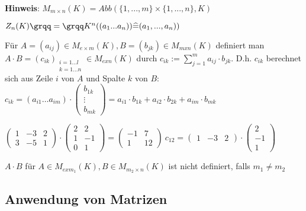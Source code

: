 \noindent\textbf{Hinweis}: $M_{m\times n}(K)=Abb(\{1,...,m\}\times\{1,...,n\},K)$\\

\begin{bem}
	$Z_n (K) \anf{=} K^n ((a_1 ...a_n))\widehat{=}(a_1 ,...,a_n))$
\end{bem}

\begin{defi}
	Für $A=(a_{ij})\in M_{e\times m}(K), B=(b_{jk})\in M_{mxn}(K)$ definiert man $A\cdot B=(c_{ik})_{\substack{i=1...l\\ k=1...n}}\in M_{exn}(K)$ durch $c_{ik}:=\sum\limits_{j=1}^m a_{ij}\cdot b_{jk}$. D.h. $c_{ik}$ berechnet sich aus Zeile $i$ von $A$ und Spalte $k$ von $B$: $c_{ik}=(a_{i1}\dots a_{im})\cdot\begin{pmatrix}
	b_{1k}\\
	\vdots\\
	b_{mk}
	\end{pmatrix}= a_{i1}\cdot b_{1k}+ a_{i2}\cdot b_{2k}+a_{im}\cdot b_{mk}$
\end{defi}

\begin{bsp}
	$\begin{pmatrix}
	1 & -3 & 2\\
	3 & -5 & 1
	\end{pmatrix}\cdot
	\begin{pmatrix}
	2 & 2\\
	1 & -1\\
	0 & 1
	\end{pmatrix}=
	\begin{pmatrix}
	-1 & 7\\
	1 & 12
	\end{pmatrix} \: c_{12}=
	\begin{pmatrix}
	1 & -3 & 2
	\end{pmatrix}\cdot
	\begin{pmatrix}
	2\\
	-1\\
	1
	\end{pmatrix}$
\end{bsp}

\begin{bem}
	$A\cdot B$ für $A\in M_{exm_1}(K),B\in M_{m_2 \times n}(K)$ ist nicht definiert, falls $m_1\neq m_2$
\end{bem}

\subsection{Anwendung von Matrizen}

